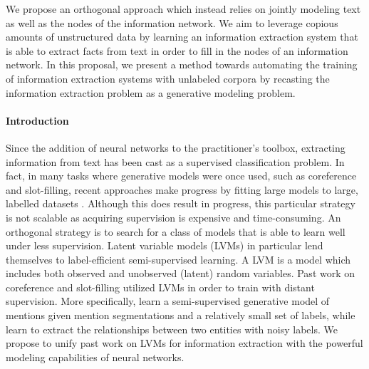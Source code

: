 \documentclass[11pt]{article}
\begin{document}
We propose an orthogonal approach which instead relies on jointly modeling
text as well as the nodes of the information network.
We aim to leverage copious amounts of unstructured data by
learning an information extraction system that is able to 
extract facts from text in order to fill in the nodes of an information network.
In this proposal, we present a method towards automating the
training of information extraction systems with unlabeled corpora
by recasting the information extraction problem as a generative modeling problem.

\paragraph{Introduction}
Since the addition of neural networks to the practitioner's toolbox,
extracting information from text has been cast as a supervised classification problem.
In fact, in many tasks where generative models were once used, such as coreference and slot-filling,
recent approaches make progress by fitting large models to large, labelled datasets \citep{lee2018coref,zhang2017slotfilling}.
Although this does result in progress, this particular strategy is not scalable as acquiring supervision is expensive
and time-consuming.
An orthogonal strategy is to search for a class of models that is able to learn well under less supervision.
Latent variable models (LVMs) in particular lend themselves to label-efficient semi-supervised learning.
A LVM is a model which includes both observed and unobserved (latent) random variables.
Past work on coreference and slot-filling utilized LVMs in order to train with distant supervision.
More specifically, \citet{haghighi2010coref} learn a semi-supervised generative model of mentions given mention
segmentations and a relatively small set of labels,
while \citet{surdeanu2012miml} learn to extract the relationships between two entities with noisy labels.
We propose to unify past work on LVMs for information extraction with the powerful modeling capabilities
of neural networks.
\end{document}
